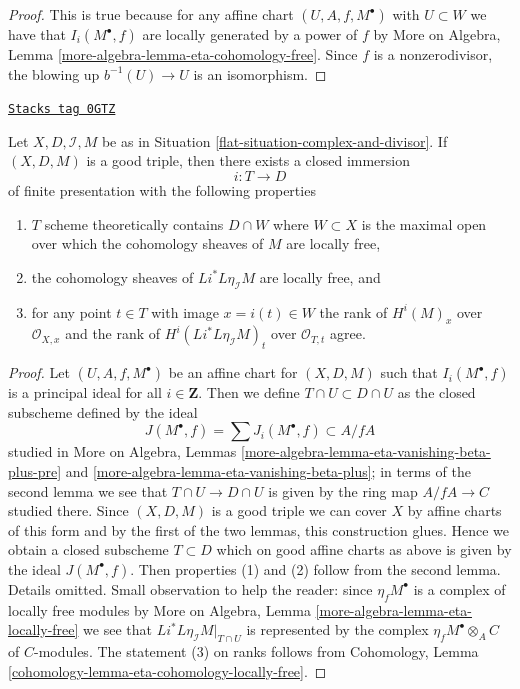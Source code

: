 \begin{proof}
This is true because for any affine chart $(U, A, f, M^\bullet)$
with $U \subset W$ we have that $I_i(M^\bullet, f)$ are locally
generated by a power of $f$ by
More on Algebra, Lemma \ref{more-algebra-lemma-eta-cohomology-free}.
Since $f$ is a nonzerodivisor,
the blowing up $b^{-1}(U) \to U$ is an isomorphism.
\end{proof}

\begin{lemma}
\label{flat-lemma-complex-and-divisor-blowup-good-T}
\href{https://stacks.math.columbia.edu/tag/0GTZ}{\texttt{Stacks tag 0GTZ}}

Let $X, D, \mathcal{I}, M$ be as in
Situation \ref{flat-situation-complex-and-divisor}.
If $(X, D, M)$ is a good triple, then there exists a
closed immersion
$$
i : T \longrightarrow D
$$
of finite presentation with the following properties
\begin{enumerate}
\item $T$ scheme theoretically contains $D \cap W$
where $W \subset X$ is the maximal open over which the
cohomology sheaves of $M$ are locally free,
\item the cohomology sheaves of $Li^*L\eta_\mathcal{I}M$
are locally free, and
\item for any point $t \in T$ with image $x = i(t) \in W$ the rank
of $H^i(M)_x$ over $\mathcal{O}_{X, x}$ and the rank
of $H^i(Li^*L\eta_\mathcal{I}M)_t$ over $\mathcal{O}_{T, t}$ agree.
\end{enumerate}
\end{lemma}

\begin{proof}
Let $(U, A, f, M^\bullet)$ be an affine chart for $(X, D, M)$
such that $I_i(M^\bullet, f)$ is a principal ideal for all $i \in \mathbf{Z}$.
Then we define $T \cap U \subset D \cap U$ as the closed subscheme
defined by the ideal
$$
J(M^\bullet, f) = \sum J_i(M^\bullet, f) \subset A/fA
$$
studied in More on Algebra, Lemmas
\ref{more-algebra-lemma-eta-vanishing-beta-plus-pre} and
\ref{more-algebra-lemma-eta-vanishing-beta-plus};
in terms of the second lemma we see that $T \cap U \to D \cap U$
is given by the ring map $A/fA \to C$ studied there.
Since $(X, D, M)$ is a good triple we can cover $X$ by
affine charts of this form and by the first of the two
lemmas, this construction glues. Hence we obtain a closed
subscheme $T \subset D$ which on good affine charts as above
is given by the ideal $J(M^\bullet, f)$. Then properties
(1) and (2) follow from the second lemma. Details omitted.
Small observation to help the reader:
since $\eta_fM^\bullet$ is a complex of locally free modules
by More on Algebra, Lemma \ref{more-algebra-lemma-eta-locally-free}
we see that $Li^*L\eta_\mathcal{I}M|_{T \cap U}$
is represented by the complex $\eta_fM^\bullet \otimes_A C$
of $C$-modules. The statement (3) on ranks follows from
Cohomology, Lemma \ref{cohomology-lemma-eta-cohomology-locally-free}.
\end{proof}

